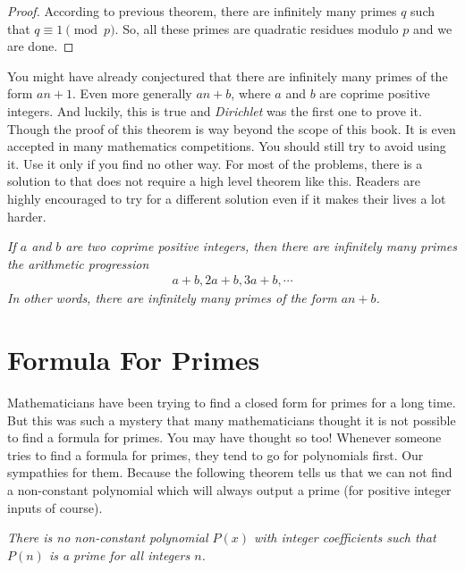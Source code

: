 \documentclass{subfiles}
\begin{document}
		\begin{proof}
			According to previous theorem, there are infinitely many primes $q$ such that $q \equiv 1 \pmod p$. So, all these primes are quadratic residues modulo $p$ and we are done.
		\end{proof}
	You might have already conjectured that there are infinitely many primes of the form $an+1$. Even more generally $an+b$, where $a$ and $b$ are coprime positive integers. And luckily, this is true and \textit{Dirichlet} was the first one to prove it. Though the proof of this theorem is way beyond the scope of this book. It is even accepted in many mathematics competitions. You should still try to avoid using it. Use it only if you find no other way. For most of the problems, there is a solution to that does not require a high level theorem like this. Readers are highly encouraged to try for a different solution even if it makes their  lives a lot harder.
		\begin{theorem}\slshape
			If $a$ and $b$ are two coprime positive integers, then there are infinitely many primes the arithmetic progression
				\begin{align*}
					a+b, 2a+b, 3a+b, \cdots
				\end{align*}
			In other words, there are infinitely many primes of the form $an+b$.
		\end{theorem}
	\section{Formula For Primes}
		Mathematicians have been trying to find a closed form for primes for a long time. But this was such a mystery that many mathematicians thought it is not possible to find a formula for primes. You may have thought so too! Whenever someone tries to find a formula for primes, they tend to go for polynomials first. Our sympathies for them. Because the following theorem tells us that we can not find a non-constant polynomial which will always output a prime (for positive integer inputs of course).
			\begin{theorem}\slshape
				There is no non-constant polynomial $P(x)$ with integer coefficients such that $P(n)$ is a prime for all integers $n$.
			\end{theorem}
			
\end{document}
